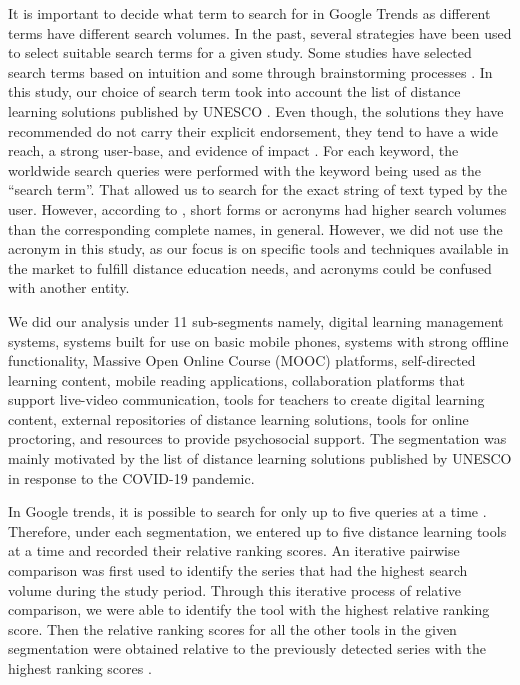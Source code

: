 \documentclass[11pt,a4paper,]{article}
\begin{document}
It is important to decide what term to search for in Google Trends as different terms have different search volumes. In the past, several strategies have been used to select suitable search terms for a given study. Some studies have selected search terms based on intuition and some through brainstorming processes \autocite{vaughan2014web}. In this study, our choice of search term took into account the list of distance learning solutions published by UNESCO \autocite{unesco2020DLsolutions}. Even though, the solutions they have recommended do not carry their explicit endorsement, they tend to have a wide reach, a strong user-base, and evidence of impact \autocite{unesco2020DLsolutions}. For each keyword, the worldwide search queries were performed with the keyword being used as the ``search term''. That allowed us to search for the exact string of text typed by the user. However, according to \textcite{vaughan2014web}, short forms or acronyms had higher search volumes than the corresponding complete names, in general. However, we did not use the acronym in this study, as our focus is on specific tools and techniques available in the market to fulfill distance education needs, and acronyms could be confused with another entity.

We did our analysis under 11 sub-segments namely, digital learning management systems, systems built for use on basic mobile phones, systems with strong offline functionality, Massive Open Online Course (MOOC) platforms, self-directed learning content, mobile reading applications, collaboration platforms that support live-video communication, tools for teachers to create digital learning content, external repositories of distance learning solutions, tools for online proctoring, and resources to provide psychosocial support. The segmentation was mainly motivated by the list of distance learning solutions published by UNESCO in response to the COVID-19 pandemic.

In Google trends, it is possible to search for only up to five queries at a time \autocite{vaughan2014web}. Therefore, under each segmentation, we entered up to five distance learning tools at a time and recorded their relative ranking scores. An iterative pairwise comparison was first used to identify the series that had the highest search volume during the study period. Through this iterative process of relative comparison, we were able to identify the tool with the highest relative ranking score. Then the relative ranking scores for all the other tools in the given segmentation were obtained relative to the previously detected series with the highest ranking scores \autocite{vaughan2014web}.
\end{document}
